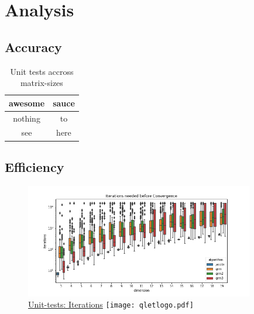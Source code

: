 \documentclass[12pt]{article}
\begin{document}
\section{Analysis}

\subsection{Accuracy}
\begin{table}
\caption{Unit tests accross matrix-sizes}
\begin{tabular}{cc}
awesome & sauce \\
\hline
nothing & to \\
see & here

\end{tabular}
\end{table}
\subsection{Efficiency}

\begin{figure}
\begin{center}
\caption{\href {https://github.com/thsis/NIS18/blob/master/tests/tests_eigen.py}{Unit-tests: Iterations}  \protect\texttt{[image: qletlogo.pdf]}}
  \includegraphics[width=\textwidth, height=5cm]{../media/plots/iterations_boxplot.png}
\end{center}
\end{figure}


\end{document}
